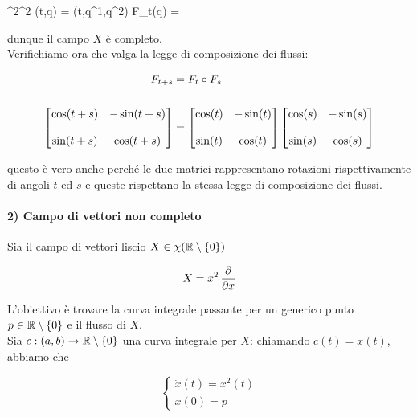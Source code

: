 	{\R \times \R^{2}}{\R^{2}}
	{(t,q) = (t,q^{1},q^{2})}{ %
								F_{t}(q) =  %
								}

dunque il campo $ X $ è completo. \\
Verifichiamo ora che valga la legge di composizione dei flussi:

\begin{align}
	\begin{split}
		F_{t+s} &= F_{t} \circ F_{s} \\ \\
		\bmqty{
				\cos(t+s) & - \sin(t+s) \\ \\
				\sin(t+s) & \cos(t+s) %
				} %
		&= %
		\bmqty{
				\cos(t) & - \sin(t) \\ \\
				\sin(t) & \cos(t) %
				} %
		\bmqty{
				\cos(s) & - \sin(s) \\ \\
				\sin(s) & \cos(s) %
				}
	\end{split}
\end{align}

questo è vero anche perché le due matrici rappresentano rotazioni rispettivamente di angoli $ t $ ed $ s $ e queste rispettano la stessa legge di composizione dei flussi.

\paragraph{2) Campo di vettori non completo}

Sia il campo di vettori liscio $ X \in \chi(\mathbb{R} \setminus \{0\}) $

\begin{equation}
	X = x^{2} \, \pdv{x}
\end{equation}

L'obiettivo è trovare la curva integrale passante per un generico punto $ p \in \mathbb{R} \setminus \{0\} $ e il flusso di $ X $. \\
Sia $ c : (a,b) \to \mathbb{R} \setminus \{0\} $ una curva integrale per $ X $: chiamando $ c(t) = x(t) $, abbiamo che

\begin{equation}
	\begin{cases}
		\dot{x}(t) = x^{2}(t) \\
		x(0) = p
	\end{cases}
\end{equation}

